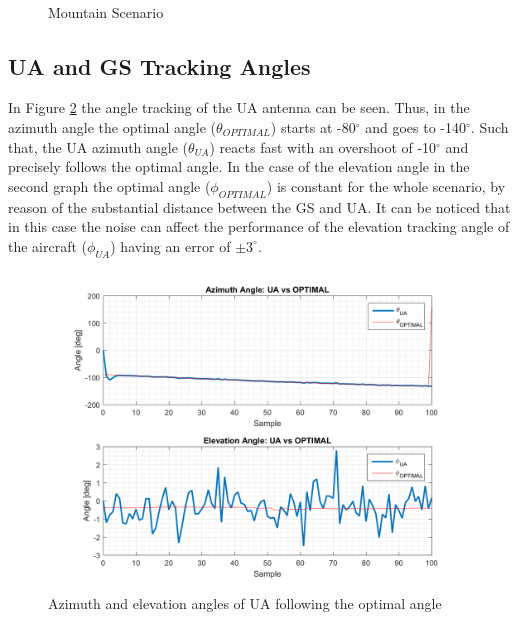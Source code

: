 \begin{figure}[H]
	\\
	\caption{Mountain Scenario}
	\label{fig:s4_map}
\end{figure}

\subsection*{UA and GS Tracking Angles}
In Figure \ref{fig:s4_ua} the angle tracking of the UA antenna can be seen. Thus, in the azimuth angle the optimal angle ($\theta_{OPTIMAL}$) starts at -80$^{\circ}$ and goes to -140$^{\circ}$. Such that, the UA azimuth angle ($\theta_{UA}$) reacts fast with an overshoot of -10$^{\circ}$ and precisely follows the optimal angle. In the case of the elevation angle in the second graph the optimal angle ($\phi_{OPTIMAL}$) is constant for the whole scenario, by reason of the substantial distance between the GS and UA. It can be noticed that in this case the noise can affect the performance of the elevation tracking angle of the aircraft ($\phi_{UA}$) having an error of $\pm3^{\circ}$. 

\begin{figure}[H]
	\centering
	\includegraphics[scale=0.8]{figures/s4_ua.png}
	\caption{Azimuth and elevation angles of UA following the optimal angle}
	\label{fig:s4_ua}
\end{figure}


